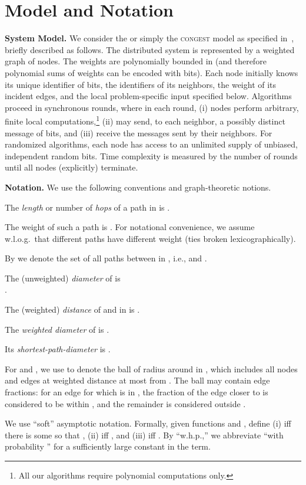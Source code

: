 \documentclass[letterpaper,11pt]{article}
\newcommand{\Congest}{\textsc{congest}\xspace}
\renewcommand{\paragraph}[1]{\smallskip\par\noindent\textbf{#1}}
\begin{document}
\section{Model and Notation}
\label{sec:model}
\paragraph{System Model.}
We consider the  or simply the \Congest model as
specified in~\cite{Peleg:book}, briefly described as follows. The
distributed system is represented 
by a weighted graph  of  nodes. The weights  are polynomially bounded in  (and therefore polynomial sums of
weights can be encoded with  bits). Each node initially
knows its unique identifier of  bits, the identifiers of
its neighbors, the weight of its incident edges, and the local
problem-specific input specified below. Algorithms proceed in
synchronous rounds, where in each round, (i) nodes perform arbitrary,
finite local computations,\footnote{All our algorithms require polynomial computations only.} (ii) may
send, to each neighbor, a possibly distinct message of  bits, and
(iii) receive the messages sent by their neighbors. For randomized algorithms,
each node has access to an unlimited supply of unbiased, independent random
bits. Time complexity is measured by the number of rounds until all nodes
(explicitly) terminate. 


\paragraph{Notation.}
We use the following conventions and graph-theoretic notions.
\begin{compactitem}
\item The \emph{length} or number of \emph{hops} of a path  in  is .
\item The weight of such a path is
  . For notational
  convenience, we assume w.l.o.g.\ that different paths have different
  weight (ties broken lexicographically).
\item By  we denote the set of all paths between  in , i.e.,  and .
\item The (unweighted) \emph{diameter} of  is \hfill\\.
\item The (weighted) \emph{distance} of  and  in  is .
\item The \emph{weighted diameter} of  is .
\item Its \emph{shortest-path-diameter} is .
\item For  and , we use  to denote the
  ball of radius  around  in , which includes all nodes and
  edges at weighted distance at most  from . The ball may
  contain edge fractions: for an edge  for which  is in
  , the  fraction of the edge closer to 
  is considered to be within , and the remainder is considered
  outside .
\end{compactitem}
We use ``soft''  asymptotic notation.
Formally, given functions
 and , define (i)  iff there is some  so that , (ii)  iff
, 
and (iii)
 iff .
By ``w.h.p.,'' we abbreviate ``with probability '' for a
sufficiently large constant in the  term.
\end{document}
